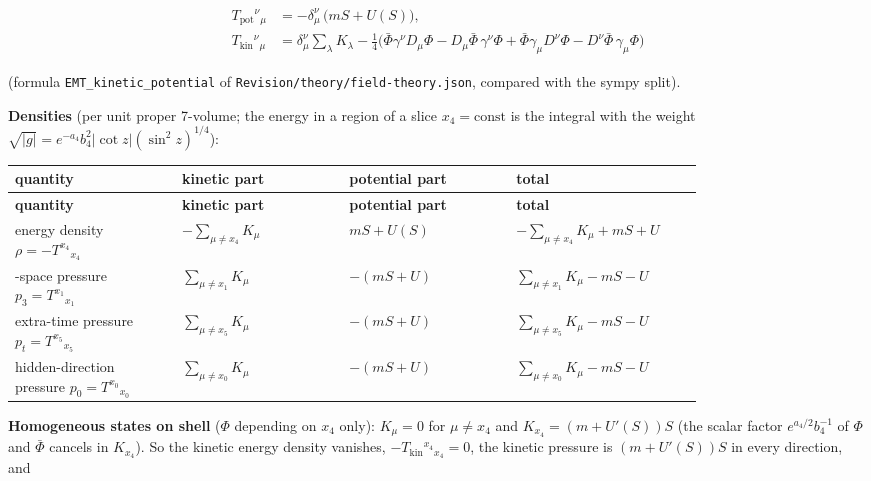 \documentclass[11pt]{article}
\begin{document}
\[
\begin{aligned}
T_{\mathrm{pot}}{}^\nu{}_\mu &= -\delta^\nu_\mu\,\big(mS + U(S)\big), \\
T_{\mathrm{kin}}{}^\nu{}_\mu &= \delta^\nu_\mu\sum_\lambda K_\lambda - \tfrac14\big(\bar\Phi\gamma^\nu D_\mu\Phi - D_\mu\bar\Phi\,\gamma^\nu\Phi + \bar\Phi\gamma_\mu D^\nu\Phi - D^\nu\bar\Phi\,\gamma_\mu\Phi\big)
\end{aligned}
\]

(formula \texttt{EMT\_kine\allowbreak{}tic\_pote\allowbreak{}ntial} of \texttt{Revision\allowbreak{}/theory/\allowbreak{}field-th\allowbreak{}eory.jso\allowbreak{}n}, compared with the sympy split).

\textbf{Densities} (per unit proper 7-volume; the energy in a region of a slice $x_4 = \mathrm{const}$ is the integral with the weight $\sqrt{|g|} = e^{-a_4}b_4^2|\cot z|(\sin^2 z)^{1/4}$):

\begingroup
\small
\begin{longtable}{@{}>{\raggedright\arraybackslash}p{0.200\linewidth}>{\raggedright\arraybackslash}p{0.200\linewidth}>{\raggedright\arraybackslash}p{0.200\linewidth}>{\raggedright\arraybackslash}p{0.200\linewidth}@{}}
\toprule
\textbf{quantity} & \textbf{kinetic part} & \textbf{potential part} & \textbf{total} \\
\midrule
\endfirsthead
\toprule
\textbf{quantity} & \textbf{kinetic part} & \textbf{potential part} & \textbf{total} \\
\midrule
\endhead
energy density $\rho = -T^{x_4}{}_{x_4}$ & $-\sum_{\mu \ne x_4} K_\mu$ & $mS + U(S)$ & $-\sum_{\mu \ne x_4} K_\mu + mS + U$ \\
3-space pressure $p_3 = T^{x_1}{}_{x_1}$ & $\sum_{\mu \ne x_1} K_\mu$ & $-(mS + U)$ & $\sum_{\mu \ne x_1} K_\mu - mS - U$ \\
extra-time pressure $p_t = T^{x_5}{}_{x_5}$ & $\sum_{\mu \ne x_5} K_\mu$ & $-(mS + U)$ & $\sum_{\mu \ne x_5} K_\mu - mS - U$ \\
hidden-direction pressure $p_0 = T^{x_0}{}_{x_0}$ & $\sum_{\mu \ne x_0} K_\mu$ & $-(mS + U)$ & $\sum_{\mu \ne x_0} K_\mu - mS - U$ \\
\bottomrule
\end{longtable}
\endgroup

\textbf{Homogeneous states on shell} ($\Phi$ depending on $x_4$ only): $K_\mu = 0$ for $\mu \ne x_4$ and $K_{x_4} = (m + U'(S))S$ (the scalar factor $e^{a_4/2}b_4^{-1}$ of $\Phi$ and $\bar\Phi$ cancels in $K_{x_4}$). So the kinetic energy density vanishes, $-T_{\mathrm{kin}}{}^{x_4}{}_{x_4} = 0$, the kinetic pressure is $(m + U'(S))S$ in every direction, and
\end{document}
